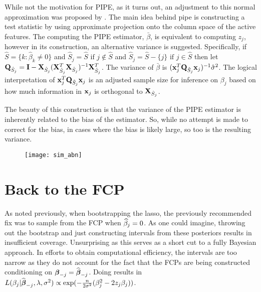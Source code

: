 
While not the motivation for PIPE, as it turns out, an adjustment to this normal approximation was proposed by . The main idea behind pipe is constructing a test statistic by using approximate projection onto the column space of the active features. The computing the PIPE estimator, $\bar{\beta}$, is equivalent to computing $z_j$, however in its construction, an alternative variance is suggested. Specifically, if $\hat{S} = \lbrace k: \hat{\beta}_k \neq  0 \rbrace$ and $\hat{S}_j = \hat{S} \text{ if } j \notin \hat{S}$ and $\hat{S}_j = \hat{S} - \lbrace j \rbrace \text{ if } j \in \hat{S}$  then let $\mathbf{Q}_{\hat{S}_j} = \mathbf{I} - \mathbf{X}_{\hat{S}_j}(\mathbf{X}_{\hat{S}_j}^T \mathbf{X}_{\hat{S}_j})^{-1} \mathbf{X}_{\hat{S}_j}^T$. The variance of $\bar{\beta}$ is $(\mathbf{x}_j^T \mathbf{Q}_{\hat{S}_j} \mathbf{x}_j)^{-1}\hat{\sigma}^2$. The logical interpretation of $\mathbf{x}_j^T \mathbf{Q}_{\hat{S}_j} \mathbf{x}_j$ is an adjusted sample size for inference on $\beta_j$ based on how much information in $\mathbf{x}_j$ is orthogonal to $\mathbf{X}_{\hat{S}_j}$. 

The beauty of this construction is that the variance of the PIPE estimator is inherently related to the bias of the estimator. So, while no attempt is made to correct for the bias, in cases where the bias is likely large, so too is the resulting variance.


\begin{figure}[hbtp]
    \begin{center}
    \texttt{[image: sim\_abn]}
    \caption{\label{Fig:sim_abn}}
    \end{center}
\end{figure}

\section{Back to the FCP}

As noted previously, when bootstrapping the lasso, the previously recommended fix was to sample from the FCP when $\widehat{\beta}_j = 0$. As one could imagine, throwing out the bootstrap and just constructing intervals from these posteriors results in insufficient coverage. Unsurprising as this serves as a short cut to a fully Bayesian approach. In efforts to obtain computational efficiency, the intervals are too narrow as they do not account for the fact that the FCPs are being constructed conditioning on $\boldsymbol{\beta}_{-j} = \widehat{\boldsymbol{\beta}}_{-j}$. Doing results in $L(\beta_j|\widehat{\boldsymbol{\beta}}_{-j}, \lambda, \sigma^2) \propto \exp(-\frac{n}{2\sigma^2}(\beta_{j}^2 - 2 z_{j} \beta_{j}))$.


